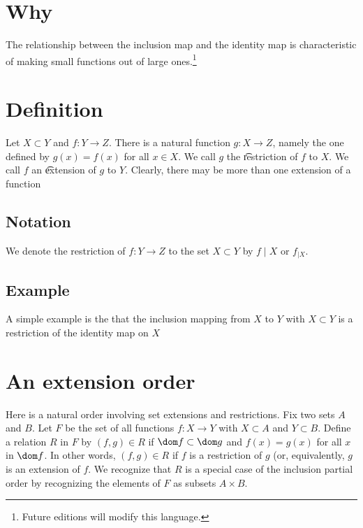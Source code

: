 
\section*{Why}

The relationship between the inclusion map and the identity map is characteristic of making small functions out of large ones.\footnote{Future editions will modify this language.}

\section*{Definition}

Let $X \subset Y$ and $f: Y \to Z$.
There is a natural function $g: X \to Z$, namely the one defined by $g(x) = f(x)$ for all $x \in X$.
We call $g$ the \t{restriction} of $f$ to $X$.
We call $f$ an \t{extension} of $g$ to $Y$.
Clearly, there may be more than one extension of a function

\subsection*{Notation}

We denote the restriction of $f: Y \to Z$ to the set $X \subset Y$ by $f\mid X$ or $f_{\mid X}$.

\subsection*{Example}

A simple example is the that the inclusion mapping from $X$ to $Y$ with $X \subset Y$ is a restriction of the identity map on $X$

\section*{An extension order}

Here is a natural order involving set extensions and restrictions.
Fix two sets $A$ and $B$.
Let $F$ be the set of all functions $f: X \to Y$ with $X \subset A$ and $Y \subset B$.
Define a relation $R$ in $F$ by $(f, g) \in R$ if $\dom f \subset \dom g$ and $f(x) = g(x)$ for all $x$ in $\dom f$.
In other words, $(f, g) \in R$ if $f$ is a restriction of $g$ (or, equivalently, $g$ is an extension of $f$.
We recognize that $R$ is a special case of the inclusion partial order by recognizing the elements of $F$ as subsets $A \times B$.

\blankpage